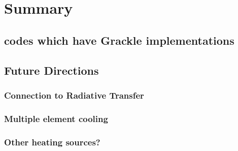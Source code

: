 \section{Summary} \label{sec:summary}



\subsection{codes which have Grackle implementations}


\subsection{Future Directions}

\subsubsection{Connection to Radiative Transfer}

\subsubsection{Multiple element cooling}

\subsubsection{Other heating sources?}
